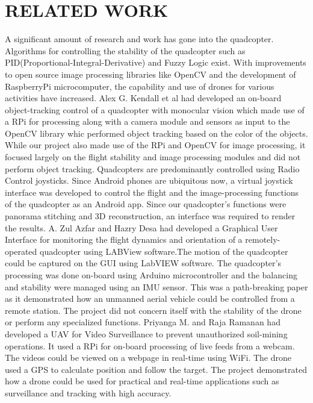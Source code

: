 \chapter{RELATED WORK} %
A significant amount of research and work has gone into the quadcopter. Algorithms for controlling the stability of the quadcopter such as PID(Proportional-Integral-Derivative) and Fuzzy Logic exist. With improvements to open source image processing libraries like OpenCV and the development of RaspberryPi microcomputer, the capability and use of drones for various activities have increased.
\newline \newline
 Alex G. Kendall et al had developed an on-board object-tracking control of a quadcopter with monocular vision \cite{kendall2014board} which made use of a RPi for processing along with a camera module and sensors as input to the OpenCV library whic performed object tracking based on the color of the objects. While our project also made use of the RPi and OpenCV for image processing, it focused largely on the flight stability and image processing modules and did not perform object tracking.
\newline \newline
Quadcopters are predominantly controlled using Radio Control joysticks. Since Android phones are ubiquitous now, a virtual joystick interface was developed to control the flight and the image-processing functions of the quadcopter as an Android app.
\newline 
\newline 
Since our quadcopter's functions were panorama stitching and 3D reconstruction, an interface was required to render the results.  A. Zul Azfar and Hazry Desa \cite{azfar2011simple} had developed a Graphical User Interface for monitoring the flight dynamics and orientation of a remotely-operated quadcopter using LABView software.The motion of the quadcopter could be captured on the GUI using LabVIEW software. The quadcopter’s processing was done on-board using Arduino microcontroller and the balancing and stability were managed using an IMU sensor. This was a path-breaking paper as it demonstrated how an unmanned aerial vehicle could be controlled from a remote station. The project did not concern itself with the stability of the drone or perform any specialized functions.
\newline \newline
 Priyanga M. and Raja Ramanan \cite{proc-disc-2009} had developed a UAV for Video Surveillance to prevent unauthorized soil-mining operations. It used a RPi for on-board processing of live feeds from a webcam. The videos could be viewed on a webpage in real-time using WiFi. The drone used a GPS to calculate position and follow the target. The project demonstrated how a drone could be used for practical and real-time applications such as surveillance and tracking with high accuracy. 
